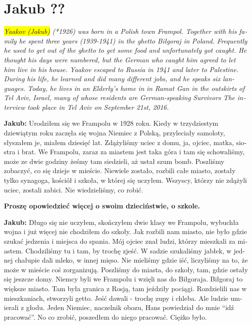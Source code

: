 \section{Jakub ??}
\begin{otherlanguage}{ngerman}
\textit{\colorbox{yellow}{Yaakov (Jakub)} (*1926) was born in a Polish town Frampol. Together with his family he spent three years (1939-1941) in the ghetto Biłgoraj in Poland. Frequently he used to get out of the ghetto to get some food and unfortunately got caught. He thought his days were numbered, but the German who caught him agreed to let him live in his house. Yaakov escaped to Russia in 1941 and later to Palestine. During his life, he learned and did many different jobs, and he speaks six languages. Today, he lives in an Elderly’s home in in Ramat Gan in the outskirts of Tel Aviv, Israel, many of whose residents are German-speaking Survivors The interview took place in Tel Aviv on September 21st, 2016.}\par
\vspace*{2em}
\textbf{Jakub:} Urodziłem się we Frampolu w 1928 roku. Kiedy w trzydziestym dziewiątym roku zaczęła się wojna Niemiec z Polską, przyleciały samoloty, słyszałem je, miałem dziesięć lat. Zdążyliśmy uciec z domu, ja, ojciec, matka, siostra i brat. We Frampolu, zaraz za miastem jest taka góra i tam się schowaliśmy, może ze dwie godziny żeśmy tam siedzieli, aż ustał szum bomb. Poszliśmy zobaczyć, co się dzieje w mieście. Niewiele zostało, rozbili całe miasto, zostały tylko synagoga, kościół i szkoła, w której się uczyłem. Wszyscy, którzy nie zdążyli uciec, zostali zabici. Nie wiedzieliśmy, co robić.  

\textbf{Proszę opowiedzieć więcej o swoim dzieciństwie, o szkole.} 

\textbf{Jakub:} Długo się nie uczyłem, skończyłem dwie klasy we Frampolu, wybuchła wojna i już więcej nie chodziłem do szkoły. Jak rozbili nam miasto, nie było gdzie szukać jedzenia i miejsca do spania. Mój ojciec znał ludzi, którzy mieszkali za miastem. Chodziliśmy tu i tam, by trochę zjeść. W sadzie szukaliśmy jabłek, w jednej chałupie dali mleko, w innej mięso. Nie mieliśmy gdzie iść, liczyliśmy na to, że może w mieście coś zorganizują. Poszliśmy do miasta, do szkoły, tam, gdzie ostały się jeszcze domy. Niemcy byli we Frampolu i wzięli nas do Biłgoraja. Biłgoraj to większe miasto. Tam była granica z Rosją, tam jeździły pociągi. Rozdzielili nas w mieszkaniach, stworzyli getto. Jeść dawali - trochę zupy i chleba. Ale ludzie umierali z głodu. Jeden Niemiec, naczelnik obozu, Hans powiedział do mnie "`idź pracować"'. No co zrobić, poszedłem do niego pracować. Ciężko było.


\end{otherlanguage}
